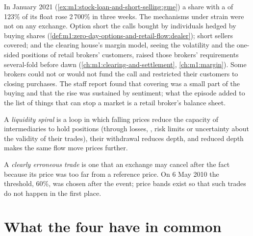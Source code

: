 In January 2021 (\cref{ex:m1:stock-loan-and-short-selling:gme}) a share with a
 of 123\% of its float rose 2\,700\% in three weeks. The
mechanisms under strain were not on any exchange. Option  short
the calls bought by individuals hedged by buying shares
(\cref{def:m1:zero-day-options-and-retail-flow:dealer}); short sellers
covered; and the clearing house's margin model, seeing the volatility and the
one-sided positions of retail brokers' customers, raised those brokers'
requirements several-fold before dawn (\cref{ch:m1:clearing-and-settlement}, \cref{ch:m1:margin}). Some brokers could
not or would not fund the call and restricted their customers to closing
purchases. The staff report found that covering was a small part of the
buying and that the rise was sustained by sentiment; what the episode added
to the list of things that can stop a market is a retail broker's balance
sheet.

\begin{definition}\label{def:m1:stress-case-studies:spiral}
A \emph{liquidity spiral} is a loop in which falling
prices reduce the capacity of intermediaries to hold positions (through
losses, , risk limits or uncertainty about the validity of their
trades), their withdrawal reduces depth, and reduced depth makes the same
flow move prices further.
\end{definition}

\begin{definition}\label{def:m1:stress-case-studies:erroneous}
A \emph{clearly erroneous trade} is one that an
exchange may cancel after the fact because its price was too far from a
reference price. On 6 May 2010 the threshold, 60\%, was chosen after the
event; price bands exist so that such trades do not happen in the first
place.
\end{definition}

\section{What the four have in common}


